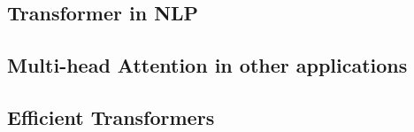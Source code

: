 \documentclass[11pt]{article}
\begin{document}
\begin{figure}[H]
    \centering
\end{figure}

\subsection{Transformer in NLP}

\begin{figure}[H]
    \centering
\end{figure}

\begin{figure}[H]
    \centering
\end{figure}

\subsection{Multi-head Attention in other applications}

\begin{figure}[H]
    \centering
\end{figure}

\begin{figure}[H]
    \centering
\end{figure}

\begin{figure}[H]
    \centering
\end{figure}

\subsection{Efficient Transformers}

\begin{figure}[H]
    \centering
\end{figure}

\begin{figure}[H]
    \centering
\end{figure}

\begin{figure}[H]
    \centering
\end{figure}
\end{document}

